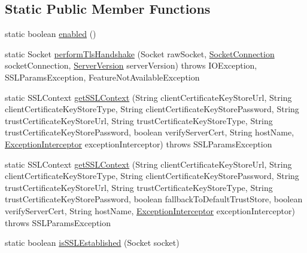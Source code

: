 \subsection*{Static Public Member Functions}
\begin{DoxyCompactItemize}
\item 
static boolean \mbox{\hyperlink{classcom_1_1mysql_1_1cj_1_1protocol_1_1_export_controlled_ab8716d93a9380a66c91a6df75a803c71}{enabled}} ()
\item 
static Socket \mbox{\hyperlink{classcom_1_1mysql_1_1cj_1_1protocol_1_1_export_controlled_a81bd557abb458b90f449ba14b7d3fe80}{perform\+Tls\+Handshake}} (Socket raw\+Socket, \mbox{\hyperlink{interfacecom_1_1mysql_1_1cj_1_1protocol_1_1_socket_connection}{Socket\+Connection}} socket\+Connection, \mbox{\hyperlink{classcom_1_1mysql_1_1cj_1_1_server_version}{Server\+Version}} server\+Version)  throws I\+O\+Exception, S\+S\+L\+Params\+Exception, Feature\+Not\+Available\+Exception 
\item 
static S\+S\+L\+Context \mbox{\hyperlink{classcom_1_1mysql_1_1cj_1_1protocol_1_1_export_controlled_a7e00720fe058b036abef04752934d37a}{get\+S\+S\+L\+Context}} (String client\+Certificate\+Key\+Store\+Url, String client\+Certificate\+Key\+Store\+Type, String client\+Certificate\+Key\+Store\+Password, String trust\+Certificate\+Key\+Store\+Url, String trust\+Certificate\+Key\+Store\+Type, String trust\+Certificate\+Key\+Store\+Password, boolean verify\+Server\+Cert, String host\+Name, \mbox{\hyperlink{interfacecom_1_1mysql_1_1cj_1_1exceptions_1_1_exception_interceptor}{Exception\+Interceptor}} exception\+Interceptor)  throws S\+S\+L\+Params\+Exception 
\item 
static S\+S\+L\+Context \mbox{\hyperlink{classcom_1_1mysql_1_1cj_1_1protocol_1_1_export_controlled_a181c1aa6b05dafc3ddf3b2943da64c0b}{get\+S\+S\+L\+Context}} (String client\+Certificate\+Key\+Store\+Url, String client\+Certificate\+Key\+Store\+Type, String client\+Certificate\+Key\+Store\+Password, String trust\+Certificate\+Key\+Store\+Url, String trust\+Certificate\+Key\+Store\+Type, String trust\+Certificate\+Key\+Store\+Password, boolean fallback\+To\+Default\+Trust\+Store, boolean verify\+Server\+Cert, String host\+Name, \mbox{\hyperlink{interfacecom_1_1mysql_1_1cj_1_1exceptions_1_1_exception_interceptor}{Exception\+Interceptor}} exception\+Interceptor)  throws S\+S\+L\+Params\+Exception 
\item 
static boolean \mbox{\hyperlink{classcom_1_1mysql_1_1cj_1_1protocol_1_1_export_controlled_a234adb48ad955b9c37b28dddaab9335d}{is\+S\+S\+L\+Established}} (Socket socket)

\end{DoxyCompactItemize}

